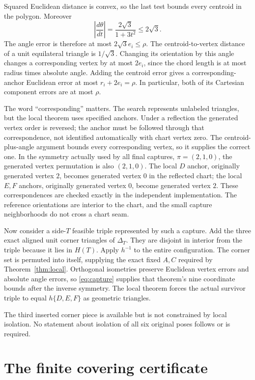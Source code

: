 \documentclass[11pt]{article}
\begin{document}
Squared Euclidean distance is convex, so the last test bounds every centroid in the polygon. Moreover
\[
 \left|\frac{d\theta}{dt}\right|=
 \frac{2\sqrt3}{1+3t^2}\le2\sqrt3.
\]
The angle error is therefore at most $2\sqrt3 e_i\le\rho$. The centroid-to-vertex distance of a unit equilateral triangle is $1/\sqrt3$. Changing its orientation by this angle changes a corresponding vertex by at most $2e_i$, since the chord length is at most radius times absolute angle. Adding the centroid error gives a corresponding-anchor Euclidean error at most $r_i+2e_i=\rho$. In particular, both of its Cartesian component errors are at most $\rho$.

The word ``corresponding'' matters. The search represents unlabeled triangles, but the local theorem uses specified anchors. Under a reflection the generated vertex order is reversed; the anchor must be followed through that correspondence, not identified automatically with chart vertex zero. The centroid-plus-angle argument bounds every corresponding vertex, so it supplies the correct one. In the symmetry actually used by all final captures, $\pi=(2,1,0)$, the generated vertex permutation is also $(2,1,0)$. The local $D$ anchor, originally generated vertex $2$, becomes generated vertex $0$ in the reflected chart; the local $E,F$ anchors, originally generated vertex $0$, become generated vertex $2$. These correspondences are checked exactly in the independent implementation. The reference orientations are interior to the chart, and the small capture neighborhoods do not cross a chart seam.

Now consider a side-$T$ feasible triple represented by such a capture. Add the three exact aligned unit corner triangles of $\Delta_T$. They are disjoint in interior from the triple because it lies in $H(T)$. Apply $h^{-1}$ to the entire configuration. The corner set is permuted into itself, supplying the exact fixed $A,C$ required by Theorem~\ref{thm:local}. Orthogonal isometries preserve Euclidean vertex errors and absolute angle errors, so \eqref{eq:capture} supplies that theorem's nine coordinate bounds after the inverse symmetry. The local theorem forces the actual survivor triple to equal $h\{D,E,F\}$ as geometric triangles.

The third inserted corner piece is available but is not constrained by local isolation. No statement about isolation of all six original poses follows or is required.

\section{The finite covering certificate}\label{sec:certificate}
\end{document}

